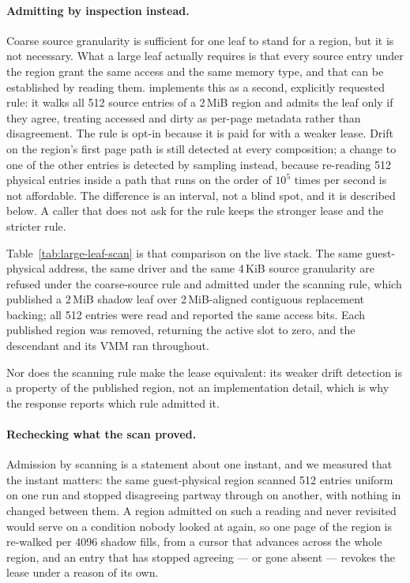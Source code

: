 \paragraph{Admitting by inspection instead.}
Coarse source granularity is sufficient for one leaf to stand for a region, but
it is not necessary. What a large leaf actually requires is that every source
entry under the region grant the same access and the same memory type, and that
can be established by reading them. \ks{} implements this as a second, explicitly
requested rule: it walks all 512 source entries of a 2\,MiB region and admits the
leaf only if they agree, treating accessed and dirty as per-page metadata rather
than disagreement. The rule is opt-in because it is paid for with a weaker lease. Drift on the
region's first page path is still detected at every composition; a change to one
of the other entries is detected by sampling instead, because re-reading 512
physical entries inside a path that runs on the order of $10^{5}$ times per
second is not affordable. The difference is an interval, not a blind spot, and
it is described below. A caller that does not ask for the rule keeps the
stronger lease and the stricter rule.

Table~\ref{tab:large-leaf-scan} is that comparison on the live stack. The same
guest-physical address, the same driver and the same 4\,KiB source granularity
are refused under the coarse-source rule and admitted under the scanning rule,
which published a 2\,MiB shadow leaf over 2\,MiB-aligned contiguous replacement
backing; all 512 entries were read and reported the same access bits. Each
published region was removed, returning the active slot to zero, and the
descendant and its VMM ran throughout.

\begin{table}[tbp]
\centering\small
\caption{The same addresses under both admission rules. Only the rule differs.
``Leaves read'' is the number of source entries the scanning rule examined.}
\label{tab:large-leaf-scan}

\end{table}

Nor does the scanning rule make the lease equivalent: its weaker drift detection
is a property of the published region, not an implementation detail, which is why
the response reports which rule admitted it.

\paragraph{Rechecking what the scan proved.}
Admission by scanning is a statement about one instant, and we measured that the
instant matters: the same guest-physical region scanned 512 entries uniform on
one run and stopped disagreeing partway through on another, with nothing in
\ks{} changed between them. A region admitted on such a reading and never
revisited would serve on a condition nobody looked at again, so one page of the
region is re-walked per 4096 shadow fills, from a cursor that advances across
the whole region, and an entry that has stopped agreeing --- or gone absent ---
revokes the lease under a reason of its own.

